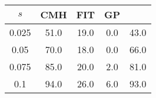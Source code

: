 \centering \begin{tabular}{c|c|c|c|c}
$s$	&CMH	&FIT	&GP	&\sc{Clear}\\\hline
0.025	&51.0	&19.0	&0.0	&43.0\\
0.05	&70.0	&18.0	&0.0	&66.0\\
0.075	&85.0	&20.0	&2.0	&81.0\\
0.1	&94.0	&26.0	&6.0	&93.0\\
\end{tabular}
